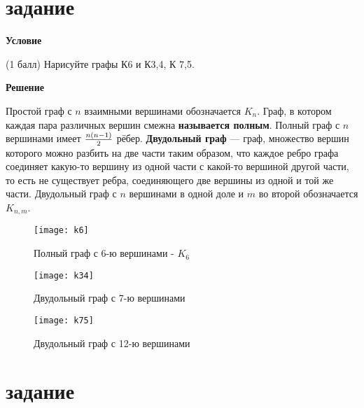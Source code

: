 \documentclass[a4paper]{article}
\begin{document}
\begin{center}
\newpage

\section{задание}

\begin{flushleft}
    \textbf{{\Large Условие}}
\end{flushleft}
\begin{flushleft}
(1 балл) Нарисуйте графы К6 и К3,4, К 7,5.
\end{flushleft}
\hfill \break

\begin{flushleft}
    \textbf{{\Large Решение}}
\end{flushleft}
\begin{flushleft}
    Простой граф с $n$ взаимными вершинами обозначается {\Large$K_n$}. Граф, в котором каждая пара различных вершин смежна \textbf{называется полным}. Полный граф с $n$ вершинами имеет $n(n-1) \over 2$ рёбер.
    \textbf{Двудольный граф} — граф, множество вершин которого можно разбить на две части таким образом, что каждое ребро графа соединяет какую-то вершину из одной части с какой-то вершиной другой части, то есть не существует ребра, соединяющего две вершины из одной и той же части. Двудольный граф с $n$ вершинами в одной доле и $m$ во второй обозначается {\Large$K_{n,m}$}.
    \begin{figure}[h]
    \centering
    \texttt{[image: k6]}
    \caption{Полный граф с 6-ю вершинами - $K_6$}
    \label{fig:graph}
    \end{figure}
    \begin{figure}[!]
    \centering
    \texttt{[image: k34]}
    \caption{Двудольный граф с 7-ю вершинами}
    \label{fig:graph}
    \end{figure}
    \begin{figure}[!]
    \centering
    \texttt{[image: k75]}
    \caption{Двудольный граф с 12-ю вершинами}
    \label{fig:graph}
    \end{figure}
\end{flushleft}

\newpage
\newpage

\section{задание}


\end{center}
\end{document}
